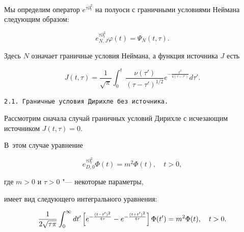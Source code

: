 Мы определим оператор $e^{\tau\partial^2_t}$ на полуоси с граничными условиями Неймана следующим образом:

\begin{equation*}

e^{\tau\partial^2_t}_{N,J}\varphi(t)=\Psi_N(t,\tau).

\end{equation*}

Здесь $N$ означает граничные условия Неймана, а функция источника $J$  есть

\begin{equation*}

J(t,\tau)=\frac{1}{\sqrt{\pi }}\int _0^t\,

\frac{\nu(\tau')}{(\tau-\tau')^{1/2}}e^{-\frac{t^2}{4(\tau-\tau ')}}d\tau'.

\end{equation*}





\smallskip



\hypertarget{razd:2}{}






{\tt 2.1. Граничные условия Дирихле без источника.}

Рассмотрим сначала \linebreak случай граничных условий Дирихле с исчезающим источником $J(t,\tau)= 0$.

В~этом случае уравнение

\begin{equation*}


e^{\tau\partial^2_t}_{D,0}\Phi(t)=m^2\Phi(t), \quad t>0,

\end{equation*}

где $m>0$ и $\tau >0$ "--- некоторые параметры,

имеет вид следующего интегрального уравнения:

\begin{equation}\label{int-Dir}

\frac{1}{2\sqrt{\tau\pi} } \int_0^\infty

dt'\,\Bigl[e^{-\frac{(t-t')^2}{4\tau}}-e^{-\frac{(t+t')^2}{4\tau}}\Bigr] \,\Phi(t')

=m^2\Phi(t),\quad  t>0.

\end{equation}

